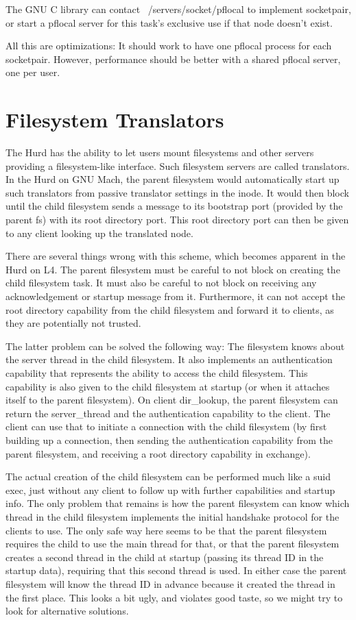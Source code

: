 \documentclass[9pt,a4paper]{extarticle}
\begin{document}
The GNU C library can contact ~/servers/socket/pflocal to implement
socketpair, or start a pflocal server for this task's exclusive use if
that node doesn't exist.

All this are optimizations: It should work to have one pflocal process
for each socketpair.  However, performance should be better with a
shared pflocal server, one per user.


\section{Filesystem Translators}

The Hurd has the ability to let users mount filesystems and other
servers providing a filesystem-like interface.  Such filesystem
servers are called translators.  In the Hurd on GNU Mach, the parent
filesystem would automatically start up such translators from passive
translator settings in the inode.  It would then block until the child
filesystem sends a message to its bootstrap port (provided by the
parent fs) with its root directory port.  This root directory port can
then be given to any client looking up the translated node.

There are several things wrong with this scheme, which becomes
apparent in the Hurd on L4.  The parent filesystem must be careful to
not block on creating the child filesystem task.  It must also be
careful to not block on receiving any acknowledgement or startup
message from it.  Furthermore, it can not accept the root directory
capability from the child filesystem and forward it to clients, as
they are potentially not trusted.

The latter problem can be solved the following way: The filesystem
knows about the server thread in the child filesystem.  It also
implements an authentication capability that represents the ability to
access the child filesystem.  This capability is also given to the
child filesystem at startup (or when it attaches itself to the parent
filesystem).  On client dir\_lookup, the parent filesystem can return
the server\_thread and the authentication capability to the client.
The client can use that to initiate a connection with the child
filesystem (by first building up a connection, then sending the
authentication capability from the parent filesystem, and receiving a
root directory capability in exchange).

The actual creation of the child filesystem can be performed much like
a suid exec, just without any client to follow up with further
capabilities and startup info.  The only problem that remains is how
the parent filesystem can know which thread in the child filesystem
implements the initial handshake protocol for the clients to use.  The
only safe way here seems to be that the parent filesystem requires the
child to use the main thread for that, or that the parent filesystem
creates a second thread in the child at startup (passing its thread ID
in the startup data), requiring that this second thread is used.  In
either case the parent filesystem will know the thread ID in advance
because it created the thread in the first place.  This looks a bit
ugly, and violates good taste, so we might try to look for alternative
solutions.
\end{document}
